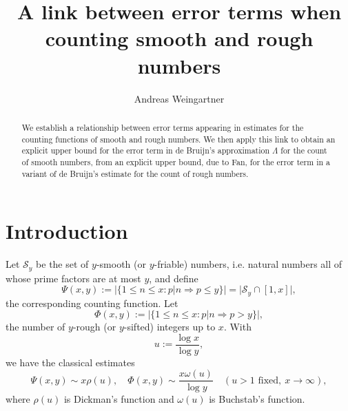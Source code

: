 \documentclass[11pt]{amsart}
\begin{document}
\title[Error terms when counting smooth and rough numbers]{A link between error terms when counting smooth and rough numbers}



\author{Andreas Weingartner} 
\address{Department of Mathematics, Southern Utah University, 351 West University Boulevard, Cedar City, Utah 84720, USA} 

\begin{abstract}
We establish a relationship between error terms appearing in estimates for the counting functions of smooth and rough numbers. 
We then apply this link to obtain an explicit upper bound for the error term  
in de Bruijn's approximation $\Lambda$ for the count of smooth numbers,
from an explicit upper bound, due to Fan, for the error term in a variant of de Bruijn's estimate for the count of rough numbers.
\end{abstract}

\maketitle

\section{Introduction}
Let $\mathcal{S}_y$ be the set of $y$-smooth (or $y$-friable) numbers, i.e. natural numbers all of whose prime factors are at most $y$, 
and define
$$
\Psi(x,y) := |\{1\le n \le x: p|n \Rightarrow p\le y\}| = |\mathcal{S}_y \cap [1,x]|,
$$
the corresponding counting function. Let 
$$
\Phi(x,y) := |\{1\le n\le x: p|n \Rightarrow p> y\}|,
$$
the number of $y$-rough (or $y$-sifted) integers up to $x$. With
$$
u:=\frac{\log x}{\log y},
$$
we have the classical estimates
$$
\Psi(x,y) \sim x \rho(u), \quad \Phi(x,y) \sim \frac{x \omega(u)}{\log y} \quad (u>1 \text{ fixed},\  x\to \infty),
$$
where $\rho(u)$ is Dickman's function and $\omega(u)$ is Buchstab's function.
\end{document}
